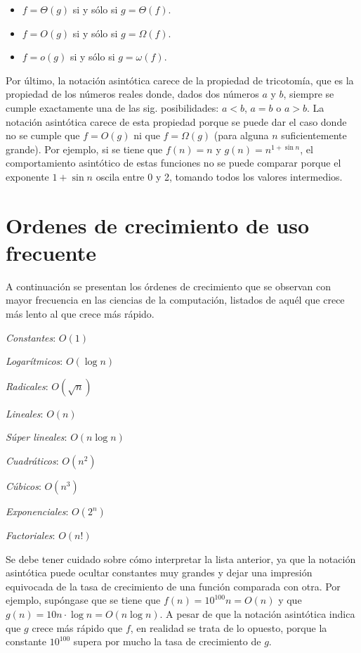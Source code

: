 \begin{itemize}[label=\textbullet]
    \item $f=\Theta(g)$ si y sólo si $g=\Theta(f)$.
    \item $f=O(g)$ si y sólo si $g=\Omega(f)$.
    \item $f=o(g)$ si y sólo si $g=\omega(f)$.
\end{itemize}

Por último, la notación asintótica carece de la propiedad
de tricotomía, que es la propiedad de los números reales donde, dados dos
números $a$ y $b$, siempre se cumple exactamente una de las sig.
posibilidades: $a<b$, $a=b$ o $a>b$. La notación asintótica carece
de esta propiedad porque se puede dar el caso donde no se cumple
que $f=O(g)$ ni que $f=\Omega(g)$ (para alguna $n$ suficientemente grande).
Por ejemplo, si se tiene que
$f(n)=n$ y $g(n)=n^{1+\sin{n}}$, el comportamiento 
asintótico de estas funciones no se puede comparar porque el
exponente $1+\sin{n}$ oscila entre 0 y 2, tomando todos los
valores intermedios.

\section{Ordenes de crecimiento de uso frecuente}

A continuación se presentan los órdenes
de crecimiento que se observan con mayor frecuencia en las ciencias de la
computación, listados de aquél que crece más lento
al que crece más rápido.

\begin{enumerate}
\begin{multicols}{2}
    \item \emph{Constantes}: $O(1)$
    \item \emph{Logarítmicos}: $O(\log n)$
    \item \emph{Radicales}: $O(\sqrt{n})$
    \item \emph{Lineales}: $O(n)$
    \item \emph{Súper lineales}: $O(n\log n)$
    \item \emph{Cuadráticos}: $O(n^{2})$
    \item \emph{Cúbicos}: $O(n^{3})$
    \item \emph{Exponenciales}: $O(2^{n})$
    \item \emph{Factoriales}: $O(n!)$
\end{multicols}
\end{enumerate}

Se debe tener cuidado sobre cómo interpretar la lista anterior, ya
que la notación asintótica puede ocultar constantes muy grandes y 
dejar una impresión equivocada de la tasa de crecimiento
de una función comparada con otra. 
Por ejemplo, supóngase que se tiene que $f(n)=10^{100}n=O(n)$
y que $g(n)=10n\cdot\log n=O(n\log n)$. A pesar de que la notación
asintótica indica que $g$ crece más rápido que $f$, en realidad
se trata de lo opuesto, porque la constante $10^{100}$ supera por mucho 
la tasa de crecimiento de $g$.

